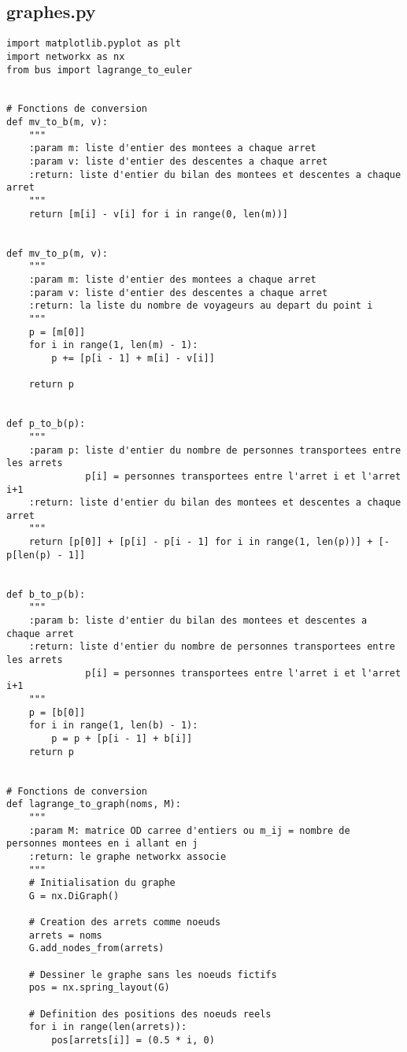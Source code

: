 \documentclass[12pt]{article}
\begin{document}
\subsection{graphes.py}
\label{graphes.py}
\begin{lstlisting}
import matplotlib.pyplot as plt
import networkx as nx
from bus import lagrange_to_euler


# Fonctions de conversion
def mv_to_b(m, v):
    """
    :param m: liste d'entier des montees a chaque arret
    :param v: liste d'entier des descentes a chaque arret
    :return: liste d'entier du bilan des montees et descentes a chaque arret
    """
    return [m[i] - v[i] for i in range(0, len(m))]


def mv_to_p(m, v):
    """
    :param m: liste d'entier des montees a chaque arret
    :param v: liste d'entier des descentes a chaque arret
    :return: la liste du nombre de voyageurs au depart du point i
    """
    p = [m[0]]
    for i in range(1, len(m) - 1):
        p += [p[i - 1] + m[i] - v[i]]

    return p


def p_to_b(p):
    """
    :param p: liste d'entier du nombre de personnes transportees entre les arrets
              p[i] = personnes transportees entre l'arret i et l'arret i+1
    :return: liste d'entier du bilan des montees et descentes a chaque arret
    """
    return [p[0]] + [p[i] - p[i - 1] for i in range(1, len(p))] + [-p[len(p) - 1]]


def b_to_p(b):
    """
    :param b: liste d'entier du bilan des montees et descentes a chaque arret
    :return: liste d'entier du nombre de personnes transportees entre les arrets
              p[i] = personnes transportees entre l'arret i et l'arret i+1
    """
    p = [b[0]]
    for i in range(1, len(b) - 1):
        p = p + [p[i - 1] + b[i]]
    return p


# Fonctions de conversion
def lagrange_to_graph(noms, M):
    """
    :param M: matrice OD carree d'entiers ou m_ij = nombre de personnes montees en i allant en j
    :return: le graphe networkx associe
    """
    # Initialisation du graphe
    G = nx.DiGraph()

    # Creation des arrets comme noeuds
    arrets = noms
    G.add_nodes_from(arrets)

    # Dessiner le graphe sans les noeuds fictifs
    pos = nx.spring_layout(G)

    # Definition des positions des noeuds reels
    for i in range(len(arrets)):
        pos[arrets[i]] = (0.5 * i, 0)


\end{lstlisting}
\end{document}
